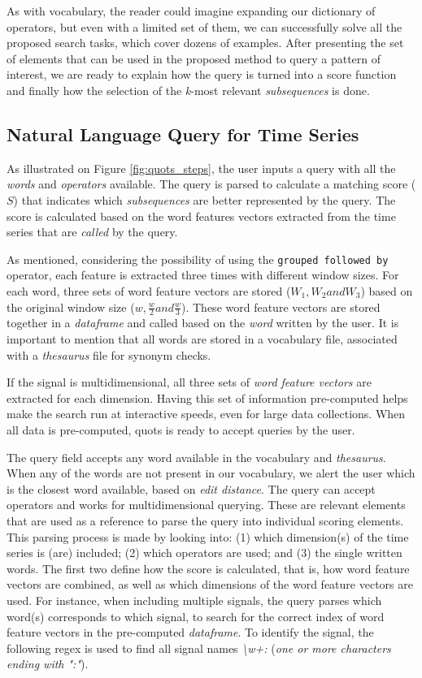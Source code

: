 As with vocabulary, the reader could imagine expanding our dictionary of operators, but even with a limited set of them, we can successfully solve all the proposed search tasks, which cover dozens of examples. After presenting the set of elements that can be used in the proposed method to query a pattern of interest, we are ready to explain how the query is turned into a score function and finally how the selection of the \textit{k}-most relevant \textit{subsequences} is done. 

\subsection{Natural Language Query for Time Series}

As illustrated on Figure \ref{fig:quots_steps}, the user inputs a query with all the \textit{words} and \textit{operators} available. The query is parsed to calculate a matching score ($S$) that indicates which \textit{subsequences} are better represented by the query. The score is calculated based on the word features vectors extracted from the time series that are \textit{called} by the query.
\par
As mentioned, considering the possibility of using the \texttt{grouped followed by} operator, each feature is extracted three times with different window sizes. For each word, three sets of word feature vectors are stored ($W_1, W_2 and W_3$) based on the original window size ($w, \frac{w}{2} and \frac{w}{3}$). These word feature vectors are stored together in a \textit{dataframe} and called based on the \textit{word} written by the user. It is important to mention that all words are stored in a vocabulary file, associated with a \textit{thesaurus} file for synonym checks.
\par
If the signal is multidimensional, all three sets of \textit{word feature vectors} are extracted for each dimension. Having this set of information pre-computed helps make the search run at interactive speeds, even for large data collections. When all data is pre-computed, \gls{quots} is ready to accept queries by the user. 
\par
The query field accepts any word available in the vocabulary and \textit{thesaurus}. When any of the words are not present in our vocabulary, we alert the user which is the closest word available, based on \textit{edit distance}. The query can accept operators and works for multidimensional querying. These are relevant elements that are used as a reference to parse the query into individual scoring elements. This parsing process is made by looking into: (1) which dimension(s) of the time series is (are) included; (2) which operators are used; and (3) the single written words. The first two define how the score is calculated, that is, how word feature vectors are combined, as well as which dimensions of the word feature vectors are used. For instance, when including multiple signals, the query parses which word(s) corresponds to which signal, to search for the correct index of word feature vectors in the pre-computed \textit{dataframe}. To identify the signal, the following \gls{regex} is used to find all signal names \textit{\textbackslash w+:} (\textit{one or more characters ending with ":"}).



